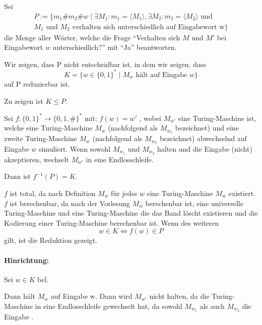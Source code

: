 \documentclass[10pt,leqno ]{article}
\begin{document}
Sei 
\begin{align*}
    P := \{ m_1 \# m_2 \# w \mid \exists M_1 : m_1 = \langle M_1 \rangle , \exists M_2 : m_2 = \langle M_2 \rangle \text{ und } \\ M_1 \text{ und } M_2 \text{ verhalten sich unterschiedlich auf Eingabewort w} \}
\end{align*}
die Menge aller Wörter, welche die Frage \enquote{Verhalten sich $M$ und $M'$ bei Eingabewort $w$ unterschiedlich?} mit \enquote{Ja} beantworten.

\begin{flushleft}
    Wir zeigen, dass P nicht entscheidbar ist, in dem wir zeigen, dass 
    \[ K = \{ w \in \{0,1 \}^* \mid M_w \text{ hält auf Eingabe } w \} \]
    auf P reduzierbar ist.
\end{flushleft}

\begin{flushleft}
    Zu zeigen ist $K \leq P$.
\end{flushleft}

\begin{flushleft}
    Sei $f: \{ 0, 1 \}^* \rightarrow \{ 0,1,\# \}^*$ mit: \( f(w) = w'\)
, wobei $M_{w'}$ eine Turing-Maschine ist, welche eine Turing-Maschine $M_w$ (nachfolgend als $M_{w_1}$ bezeichnet) und eine zweite Turing-Maschine $M_w$ (nachfolgend als $M_{w_2}$ bezeichnet) abwechselnd auf Eingabe $w$ simuliert. Wenn sowohl $M_{w_1}$ und  $M_{w_2}$ halten und die Eingabe (nicht) akzeptieren, wechselt $M_{w'}$ in eine Endlosschleife.  
\end{flushleft}
Dann ist $f^{-1}(P) = K$.

\begin{flushleft}
    $f$ ist total, da nach Definition $M_w$ für jedes $w$ eine Turing-Maschine $M_w$ existiert. $f$ ist berechenbar, da nach der Vorlesung $M_w$ berechenbar ist, eine universelle Turing-Maschine und eine Turing-Maschine die das Band löscht existieren und die Kodierung einer Turing-Maschine berechenbar ist.
    Wenn des weiteren
    \[ w \in K \Leftrightarrow f(w) \in P \]
    gilt, ist die Reduktion gezeigt.
\end{flushleft}

\paragraph{Hinrichtung:} 
Sei $w \in K$ bel.

Dann hält $M_w$ auf Eingabe w.
Dann wird $M_{w'}$ nicht halten, da die Turing-Maschine in eine Endlosschleife gewechselt hat, da sowohl $M_{w_1}$ als auch $M_{w_2}$ die Eingabe . 
\end{document}
